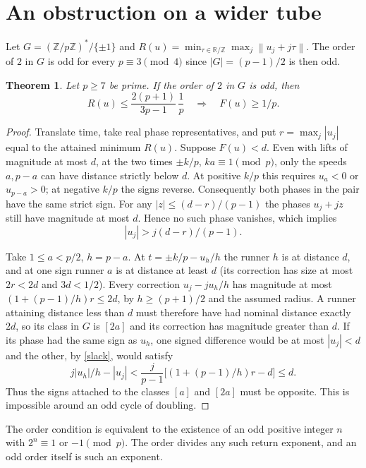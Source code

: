 \documentclass[11pt]{article}
\newtheorem{theorem}{Theorem}
\newcommand{\dist}[1]{\left\lVert #1\right\rVert}
\begin{document}
\section{An obstruction on a wider tube}
Let $G=(\mathbb Z/p\mathbb Z)^*/\{\pm1\}$ and
$R(u)=\min_{\tau\in\mathbb R/\mathbb Z}\max_j\dist{u_j+j\tau}$.
The order of $2$ in $G$ is odd for every $p\equiv3\pmod4$ since
$|G|=(p-1)/2$ is then odd.

\begin{theorem}\label{tube}
Let $p\ge7$ be prime. If the order of $2$ in $G$ is odd, then
\[
 R(u)\le \frac{2(p+1)}{3p-1}\,\frac1p
 \quad\Longrightarrow\quad F(u)\ge1/p .
\]
\end{theorem}
\begin{proof}
Translate time, take real phase representatives, and put
$r=\max_j|u_j|$ equal to the attained minimum $R(u)$.
Suppose $F(u)<d$. Even with lifts of magnitude at most $d$, at the
two times $\pm k/p$, $ka\equiv1\pmod p$, only the speeds $a,p-a$
can have distance strictly below $d$. At positive $k/p$ this requires
$u_a<0$ or $u_{p-a}>0$; at negative $k/p$ the signs reverse.
Consequently both phases in the pair have the same strict sign.
For any $|z|\le(d-r)/(p-1)$ the phases $u_j+jz$ still have magnitude
at most $d$. Hence no such phase vanishes, which implies
\begin{equation}\label{slack}
 |u_j|>j(d-r)/(p-1).
\end{equation}

Take $1\le a<p/2$, $h=p-a$. At $t=\pm k/p-u_h/h$ the runner
$h$ is at distance $d$, and at one sign runner $a$ is at distance
at least $d$ (its correction has size at most $2r<2d$ and $3d<1/2$).
Every correction $u_j-ju_h/h$ has magnitude at most
$(1+(p-1)/h)r\le2d$, by $h\ge(p+1)/2$ and the assumed radius.
A runner attaining distance less than $d$ must therefore have had
nominal distance exactly $2d$, so its class in $G$ is $[2a]$ and
its correction has magnitude greater than $d$.
If its phase had the same sign as $u_h$, one signed difference
would be at most $|u_j|<d$ and the other, by \eqref{slack}, would satisfy
\[
 j|u_h|/h-|u_j|<
 \frac{j}{p-1}\big[(1+(p-1)/h)r-d\big]\le d .
\]
Thus the signs attached to the classes $[a]$ and $[2a]$ must be
opposite. This is impossible around an odd cycle of doubling.
\end{proof}

The order condition is equivalent to the existence of an odd positive
integer $n$ with $2^n\equiv1$ or $-1\pmod p$. The order divides any such
return exponent, and an odd order itself is such an exponent.
\end{document}
